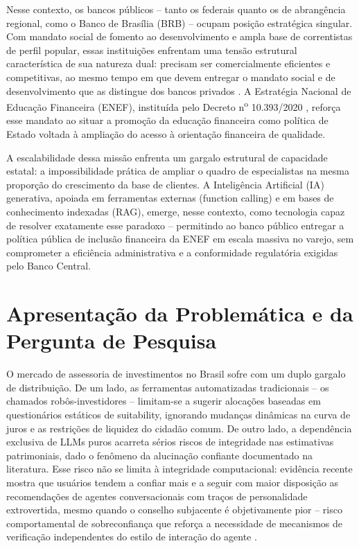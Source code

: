 Nesse contexto, os bancos p\'ublicos -- tanto os federais quanto os de
abrang\^encia regional, como o Banco de Bras\'ilia (BRB) -- ocupam
posi\c{c}\~ao estrat\'egica singular. Com mandato social de fomento ao
desenvolvimento e ampla base de correntistas de perfil popular, essas
institui\c{c}\~oes enfrentam uma tens\~ao estrutural caracter\'istica de
sua natureza dual: precisam ser comercialmente eficientes e competitivas,
ao mesmo tempo em que devem entregar o mandato social e de desenvolvimento
que as distingue dos bancos privados \autocite{costa2016}. A Estrat\'egia
Nacional de Educa\c{c}\~ao Financeira (ENEF), institu\'ida pelo Decreto
n\textsuperscript{o} 10.393/2020 \autocite{decreto10393}, refor\c{c}a esse mandato ao situar a
promo\c{c}\~ao da educa\c{c}\~ao financeira como pol\'itica de Estado
voltada \`a amplia\c{c}\~ao do acesso \`a orienta\c{c}\~ao financeira de
qualidade.

A escalabilidade dessa miss\~ao enfrenta um gargalo estrutural de
capacidade estatal: a impossibilidade pr\'atica de ampliar o quadro de
especialistas na mesma propor\c{c}\~ao do crescimento da base de clientes.
A Intelig\^encia Artificial (IA) generativa, apoiada em ferramentas
externas (function calling) e em bases de conhecimento indexadas (RAG),
emerge, nesse contexto, como tecnologia capaz de resolver exatamente esse
paradoxo -- permitindo ao banco p\'ublico entregar a pol\'itica p\'ublica
de inclus\~ao financeira da ENEF em escala massiva no varejo, sem
comprometer a efici\^encia administrativa e a conformidade regulat\'oria
exigidas pelo Banco Central.

\section{Apresenta\c{c}\~ao da Problem\'atica e da Pergunta de Pesquisa}
\label{sec:problematica}

O mercado de assessoria de investimentos no Brasil sofre com um duplo
gargalo de distribui\c{c}\~ao. De um lado, as ferramentas automatizadas
tradicionais -- os chamados rob\^os-investidores -- limitam-se a sugerir
aloca\c{c}\~oes baseadas em question\'arios est\'aticos de suitability,
ignorando mudan\c{c}as din\^amicas na curva de juros e as restri\c{c}\~oes
de liquidez do cidad\~ao comum. De outro lado, a depend\^encia exclusiva
de LLMs puros acarreta s\'erios riscos de integridade nas estimativas
patrimoniais, dado o fen\^omeno da alucina\c{c}\~ao confiante documentado
na literatura. Esse risco n\~ao se limita \`a integridade computacional:
evid\^encia recente mostra que usu\'arios tendem a confiar mais e a
seguir com maior disposi\c{c}\~ao as recomenda\c{c}\~oes de agentes
conversacionais com tra\c{c}os de personalidade extrovertida, mesmo
quando o conselho subjacente \'e objetivamente pior -- risco
comportamental de sobreconfian\c{c}a que refor\c{c}a a necessidade de
mecanismos de verifica\c{c}\~ao independentes do estilo de intera\c{c}\~ao
do agente \autocite{takayanagi2025}.

